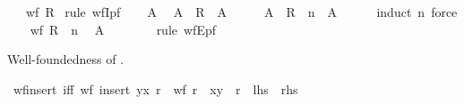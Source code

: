 \begin{isabellebody}
\ \ \ {\isachardoublequoteopen}wf\ R{\isachardoublequoteclose}\isanewline
%
\isadelimproof
%
\endisadelimproof
%
\isatagproof
{}\isamarkupfalse%
\ {\isacharparenleft}{\kern0pt}rule\ wfI{\isacharunderscore}{\kern0pt}pf{\isacharparenright}{\kern0pt}\isanewline
\ \ \isamarkupfalse%
\ A\ \isamarkupfalse%
\ {\isachardoublequoteopen}A\ {\isasymsubseteq}\ R\ {\isacharbackquote}{\kern0pt}{\isacharbackquote}{\kern0pt}\ A{\isachardoublequoteclose}\isanewline
\ \ \isamarkupfalse%
\ \isamarkupfalse%
\ {\isachardoublequoteopen}A\ {\isasymsubseteq}\ {\isacharparenleft}{\kern0pt}R\ {\isacharcircum}{\kern0pt}{\isacharcircum}{\kern0pt}\ n{\isacharparenright}{\kern0pt}\ {\isacharbackquote}{\kern0pt}{\isacharbackquote}{\kern0pt}\ A{\isachardoublequoteclose}\isanewline
\ \ \ \ \isamarkupfalse%
\ {\isacharparenleft}{\kern0pt}induct\ n{\isacharparenright}{\kern0pt}\ force{\isacharplus}{\kern0pt}\isanewline
\ \ \isamarkupfalse%
\ {\isacartoucheopen}wf\ {\isacharparenleft}{\kern0pt}R\ {\isacharcircum}{\kern0pt}{\isacharcircum}{\kern0pt}\ n{\isacharparenright}{\kern0pt}{\isacartoucheclose}\ \isamarkupfalse%
\ {\isachardoublequoteopen}A\ {\isacharequal}{\kern0pt}\ {\isacharbraceleft}{\kern0pt}{\isacharbraceright}{\kern0pt}{\isachardoublequoteclose}\isanewline
\ \ \ \ \isamarkupfalse%
\ {\isacharparenleft}{\kern0pt}rule\ wfE{\isacharunderscore}{\kern0pt}pf{\isacharparenright}{\kern0pt}\isanewline
{}\isamarkupfalse%
%
\endisatagproof
{\isafoldproof}%
%
\isadelimproof
%
\endisadelimproof
%
\begin{isamarkuptext}%
Well-foundedness of .%
\end{isamarkuptext}\isamarkuptrue%
\isamarkupfalse%
\ wf{\isacharunderscore}{\kern0pt}insert\ {\isacharbrackleft}{\kern0pt}iff{\isacharbrackright}{\kern0pt}{\isacharcolon}{\kern0pt}\ {\isachardoublequoteopen}wf\ {\isacharparenleft}{\kern0pt}insert\ {\isacharparenleft}{\kern0pt}y{\isacharcomma}{\kern0pt}x{\isacharparenright}{\kern0pt}\ r{\isacharparenright}{\kern0pt}\ {\isasymlongleftrightarrow}\ wf\ r\ {\isasymand}\ {\isacharparenleft}{\kern0pt}x{\isacharcomma}{\kern0pt}y{\isacharparenright}{\kern0pt}\ {\isasymnotin}\ r\isactrlsup {\isacharasterisk}{\kern0pt}{\isachardoublequoteclose}\ {\isacharparenleft}{\kern0pt}\ {\isachardoublequoteopen}{\isacharquery}{\kern0pt}lhs\ {\isacharequal}{\kern0pt}\ {\isacharquery}{\kern0pt}rhs{\isachardoublequoteclose}{\isacharparenright}{\kern0pt}\isanewline

\end{isabellebody}
